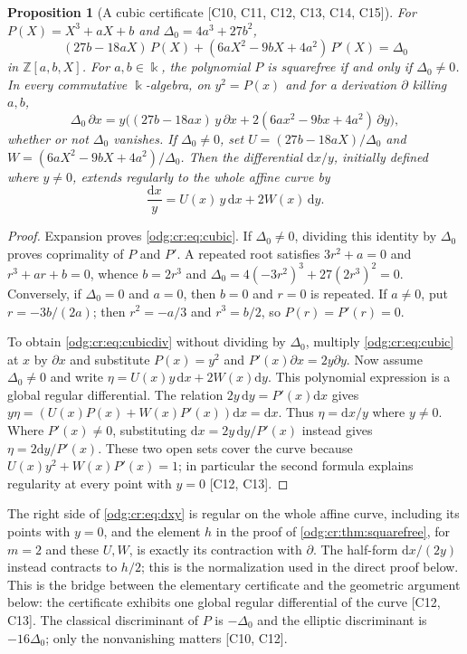 \documentclass[11pt,oneside]{article}
\numberwithin{equation}{section}
\newtheorem{proposition}[proposition]{Proposition}
\theoremstyle{definition}
\theoremstyle{remark}
\newcommand{\Z}{\mathbb Z}
\newcommand{\src}[1]{\textup{\textsf{\small[#1]}}}
\newcommand{\dif}{\mathrm d}
\begin{document}
\begin{proposition}[A cubic certificate \src{C10, C11, C12, C13, C14, C15}]\label{odg:cr:prop:cubic}
For $P(X)=X^3+aX+b$ and $\Delta_0=4a^3+27b^2$,
\begin{equation}\label{odg:cr:eq:cubic}
 (27b-18aX)\,P(X)+(6aX^2-9bX+4a^2)\,P'(X)=\Delta_0
\end{equation}
in $\Z[a,b,X]$. For $a,b\in\Bbbk$, the polynomial $P$ is squarefree if and
only if $\Delta_0\ne0$. In every commutative $\Bbbk$-algebra, on
$y^2=P(x)$ and for a derivation $\partial$ killing $a,b$,
\begin{equation}\label{odg:cr:eq:cubicdiv}
 \Delta_0\,\partial x=y\bigl((27b-18ax)\,y\,\partial x+2(6ax^2-9bx+4a^2)\,\partial y\bigr),
\end{equation}
whether or not $\Delta_0$ vanishes. If $\Delta_0\ne0$, set
$U=(27b-18aX)/\Delta_0$ and $W=(6aX^2-9bX+4a^2)/\Delta_0$. Then the
differential $\dif x/y$, initially defined where $y\ne0$, extends regularly
to the whole affine curve by
\begin{equation}\label{odg:cr:eq:dxy}
 \frac{\dif x}{y}=U(x)\,y\,\dif x+2W(x)\,\dif y .
\end{equation}
\end{proposition}
\begin{proof}
Expansion proves \eqref{odg:cr:eq:cubic}. If $\Delta_0\ne0$, dividing this
identity by $\Delta_0$ proves coprimality of $P$ and $P'$. A repeated root
satisfies $3r^2+a=0$ and $r^3+ar+b=0$, whence $b=2r^3$ and
$\Delta_0=4(-3r^2)^3+27(2r^3)^2=0$. Conversely, if $\Delta_0=0$ and $a=0$,
then $b=0$ and $r=0$ is repeated. If $a\ne0$, put $r=-3b/(2a)$;
then $r^2=-a/3$ and $r^3=b/2$, so $P(r)=P'(r)=0$.

To obtain \eqref{odg:cr:eq:cubicdiv} without dividing by $\Delta_0$,
multiply \eqref{odg:cr:eq:cubic} at $x$ by $\partial x$ and substitute
$P(x)=y^2$ and $P'(x)\partial x=2y\partial y$.
Now assume $\Delta_0\ne0$ and write
$\eta=U(x)y\,\dif x+2W(x)\dif y$. This polynomial expression is a global
regular differential. The relation $2y\,\dif y=P'(x)\dif x$ gives
$y\eta=(U(x)P(x)+W(x)P'(x))\dif x=\dif x$.
Thus $\eta=\dif x/y$ where $y\ne0$. Where $P'(x)\ne0$, substituting
$\dif x=2y\,\dif y/P'(x)$ instead gives $\eta=2\dif y/P'(x)$.
These two open sets cover the curve because $U(x)y^2+W(x)P'(x)=1$;
in particular the second formula explains regularity at every point
with $y=0$ \src{C12, C13}.
\end{proof}

The right side of \eqref{odg:cr:eq:dxy} is regular on the whole affine curve,
including its points with $y=0$, and the element $h$ in the proof of
\cref{odg:cr:thm:squarefree}, for $m=2$ and these $U,W$, is exactly its
contraction with $\partial$. The half-form $\dif x/(2y)$ instead contracts
to $h/2$; this is the normalization used in the direct proof below.
This is the bridge between the elementary certificate and the geometric argument
below: the certificate exhibits one global regular differential of the curve
\src{C12, C13}. The classical discriminant of $P$ is $-\Delta_0$ and the elliptic
discriminant is $-16\Delta_0$; only the nonvanishing matters \src{C10, C12}.
\end{document}

